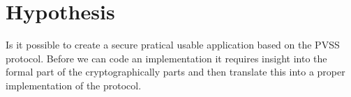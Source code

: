 \section{Hypothesis}
Is it possible to create a secure pratical usable application based on the PVSS protocol. Before we can code an implementation it requires insight into the formal part of the cryptographically parts and then translate this into a proper implementation of the protocol. 

